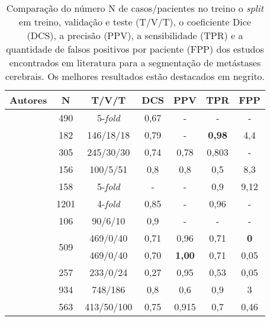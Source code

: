 \begin{table}[ht]
\centering
\caption{Comparação do número N de casos/pacientes no treino o \textit{split} em treino, validação e teste (T/V/T), o coeficiente Dice (DCS), a precisão (PPV), a sensibilidade (TPR) e a quantidade de falsos positivos por paciente (FPP) dos estudos encontrados em literatura para a segmentação de metástases cerebrais. Os melhores resultados estão destacados em negrito.}
\begin{tabular}{ccccccc}
\hline
Autores                         & N                    & T/V/T                 & DCS  & PPV   & TPR   & FPP   \\ \hline
\cite{Liu:2017}                         & 490                  & 5-\textit{fold}                   & 0,67 & -     & -     & -     \\
\cite{Charron:2018}                     & 182                  & 146/18/18                   & 0,79 & -     & \textbf{0,98}  & 4,4   \\
\cite{Hu:2019}                      & 305                  & 245/30/30                    & 0,74  & 0,78   & 0,803   & -   \\
\cite{Grovik:2020}                      & 156                  & 100/5/51                    & 0,8  & 0,8   & 0,5   & 8,3   \\
\cite{Dikici:2020}                     & 158                  & 5-\textit{fold}                   & -    & -     & 0,9   & 9,12  \\
\cite{Xue:2020}                         & 1201                 & 4-\textit{fold}                   & 0,85 & -     & 0,96  & -     \\
\cite{Jalalifar:2020}                     & 106                  & 90/6/10                     & 0,9  & -     & -     & -     \\
\multirow{3}{*}{\cite{Bousabarah:2020}} & \multirow{2}{*}{509} & 469/0/40                    & 0,71 & 0,96  & 0,71  & \textbf{0}     \\
                              &                      & 469/0/40                    & 0,70 & \textbf{1,00}  & 0,71  & 0,05  \\
                              & 257                  & 233/0/24                    & 0,27 & 0,95  & 0,53  & 0,05  \\
\cite{Zhou:2020}                        & 934                  & 748/186                     & 0,8  & 0,6   & 0,9   & 3     \\
\cite{Rudie:2021}                      & 563                  & 413/50/100                    & 0,75  & 0,915   & 0,7   & 0,46   \\


\end{tabular}
\end{table}
